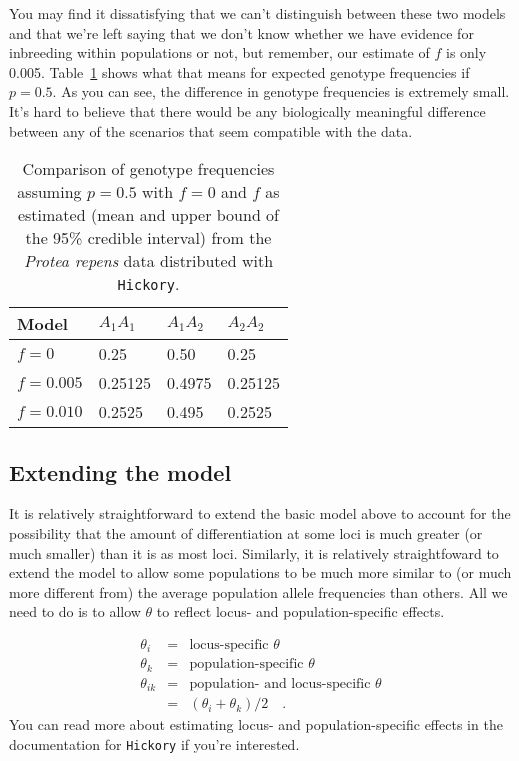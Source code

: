You may find it dissatisfying that we can't distinguish between these
two models and that we're left saying that we don't know whether we
have evidence for inbreeding within populations or not, but remember,
our estimate of $f$ is only
0.005. Table~\ref{table:f-model-comparison} shows what that means for
expected genotype frequencies if $p = 0.5$. As you can see, the
difference in genotype frequencies is extremely small. It's hard to
believe that there would be any biologically meaningful difference
between any of the scenarios that seem compatible with the data.

\begin{table}
  \begin{center}
    \begin{tabular}{l|lll}
      \hline\hline
      Model       & $A_1A_1$ & $A_1A_2$ & $A_2A_2$ \\
      \hline
      $f = 0$     & 0.25     & 0.50    & 0.25 \\
      $f = 0.005$ & 0.25125  & 0.4975  & 0.25125 \\
      $f = 0.010$ & 0.2525   & 0.495   & 0.2525 \\
      \hline
    \end{tabular}
  \end{center}
  \caption{Comparison of genotype frequencies assuming $p = 0.5$ with
    $f = 0$ and $f$ as estimated (mean and upper bound of the 95\%
    credible interval) from the {\it Protea repens\/} data distributed
    with {\tt Hickory}.}\label{table:f-model-comparison}
\end{table}

\subsection*{Extending the model}

It is relatively straightforward to extend the basic model above to
account for the possibility that the amount of differentiation at some
loci is much greater (or much smaller) than it is as most
loci. Similarly, it is relatively straightfoward to extend the model
to allow some populations to be much more similar to (or much more
different from) the average population allele frequencies than
others. All we need to do is to allow $\theta$ to reflect locus- and
population-specific effects.

\begin{eqnarray*}
  \theta_i &=& \mbox{locus-specific $\theta$} \\
  \theta_k &=& \mbox{population-specific $\theta$} \\
  \theta_{ik} &=& \mbox{population- and locus-specific $\theta$} \\
  &=& (\theta_i + \theta_k)/2 \quad .
\end{eqnarray*}
You can read more about estimating locus- and population-specific
effects in the documentation for {\tt Hickory} if you're interested.

